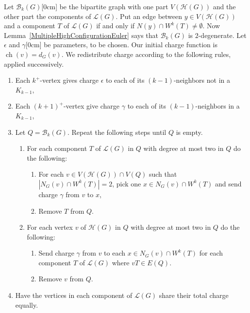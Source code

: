 \documentclass[12pt]{article}
\theoremstyle{plain}
\theoremstyle{definition}
\theoremstyle{remark}
\newcommand{\fancy}[1]{\mathcal{#1}}
\newcommand{\B}{\fancy{B}}
\renewcommand{\L}{\fancy{L}}
\newcommand{\HH}{\fancy{H}}
\newcommand{\card}[1]{\left|#1\right|}
\newcommand{\ch}{\operatorname{ch}}
\newcommand{\aside}[1]{\marginnote{\scriptsize{#1}}[0cm]}
\begin{document}
Let $\B_k(G)$\aside{$\B_k(G)$} be the bipartite graph with one part $V(\HH(G))$
and the other part the components of $\L(G)$.  Put an edge between $y \in
V(\HH(G))$ and a component $T$ of $\L(G)$ if and only if $N(y) \cap W^k(T) \ne
\emptyset$.  Now Lemma~\ref{MultipleHighConfigurationEuler} says that $\B_k(G)$
is $2$-degenerate.
%
Let $\epsilon$ and $\gamma$\aside{$\epsilon, \gamma$} be parameters, to be
chosen. Our initial charge function is $\ch(v) = d_G(v)$.  We
redistribute charge according to the following rules, applied successively.  
\begin{enumerate}
	\item Each $k^+$-vertex gives charge $\epsilon$ to each of its $(k-1)$-neighbors not in a $K_{k-1}$,
	\item Each $(k+1)^+$-vertex give charge $\gamma$ to each of its $(k-1)$-neighbors in a $K_{k-1}$,
	\item Let $Q = \B_k(G)$.  Repeat the following steps until $Q$ is empty.
	  \begin{enumerate}
	  	\item For each component $T$ of $\L(G)$ in $Q$ with degree at most two in $Q$ do the following:
	  	    \begin{enumerate}
	  	    	\item For each $v \in V(\HH(G)) \cap V(Q)$ such that $\card{N_G(v) \cap W^k(T)} = 2$, pick one $x \in N_G(v) \cap W^k(T)$ and send charge $\gamma$ from $v$ to $x$,
	  	    	\item Remove $T$ from $Q$.
	  	    \end{enumerate}
	  	\item For each vertex $v$ of $\HH(G)$ in $Q$ with degree at most two in $Q$ do the following:  
	  	    \begin{enumerate}
	  	        \item Send charge $\gamma$ from $v$ to each $x \in N_G(v) \cap W^k(T)$ for each component $T$ of $\L(G)$ where $vT \in E(Q)$.
	  	        \item Remove $v$ from $Q$.
	        \end{enumerate}
	  \end{enumerate}
	\item Have the vertices in each component of $\L(G)$ share their total charge equally.
\end{enumerate}
\end{document}
